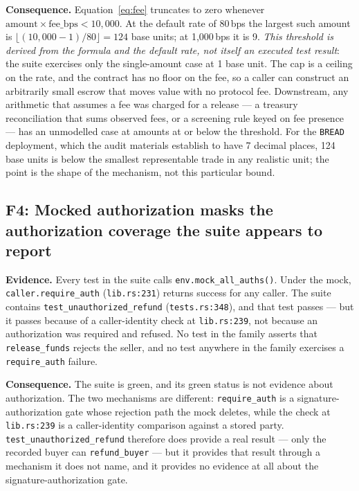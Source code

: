 \documentclass[sigconf,review]{acmart}
\begin{document}
\textbf{Consequence.} Equation~\ref{eq:fee} truncates to zero whenever
$\mathrm{amount} \times \mathrm{fee\_bps} < 10{,}000$. At the default rate of
80\,bps the largest such amount is $\lfloor (10{,}000-1)/80 \rfloor = 124$ base
units; at 1{,}000\,bps it is 9. \emph{This threshold is derived from the
formula and the default rate, not itself an executed test result}: the suite
exercises only the single-amount case at 1 base unit. The cap is a ceiling on
the rate, and the contract has no floor on the fee, so a caller can construct
an arbitrarily small escrow that moves value with no protocol fee.
Downstream, any arithmetic that assumes a fee was charged for a release --- a
treasury reconciliation that sums observed fees, or a screening rule keyed on
fee presence --- has an unmodelled case at amounts at or below the threshold.
For the \texttt{BREAD} deployment, which the audit materials establish to have
7 decimal places, 124 base units is below the smallest representable trade in
any realistic unit; the point is the shape of the mechanism, not this
particular bound.

\subsection{F4: Mocked authorization masks the authorization coverage the
suite appears to report}
\label{f:auth}

\textbf{Evidence.} Every test in the suite calls
\texttt{env.mock\_all\_auths()}. Under the mock, \texttt{caller.require\_auth}
(\texttt{lib.rs:231}) returns success for any caller. The suite contains
\texttt{test\_unauthorized\_refund} (\texttt{tests.rs:348}), and that test
passes --- but it passes because of a caller-identity check at
\texttt{lib.rs:239}, not because an authorization was required and refused. No
test in the family asserts that \texttt{release\_funds} rejects the seller, and
no test anywhere in the family exercises a \texttt{require\_auth} failure.

\textbf{Consequence.} The suite is green, and its green status is not evidence
about authorization. The two mechanisms are different:
\texttt{require\_auth} is a signature-authorization gate whose rejection path
the mock deletes, while the check at \texttt{lib.rs:239} is a
caller-identity comparison against a stored party. \texttt{test\_unauthorized\_refund}
therefore does provide a real result --- only the recorded buyer can
\texttt{refund\_buyer} --- but it provides that result through a mechanism it does
not name,
and it provides no evidence at all about the signature-authorization gate.
\end{document}
